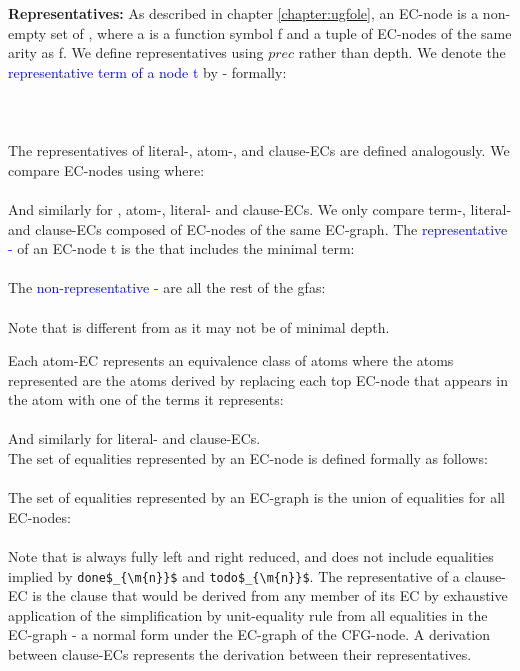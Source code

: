 \textbf{Representatives:}
As described in chapter \ref{chapter:ugfole}, an EC-node is a non-empty set of \GFAs{}, where a \GFA{}  is a function symbol f and a tuple  of EC-nodes of the same arity as f. We define representatives using $prec$ rather than depth.
We denote the \textcolor{blue}{representative term of a node t} by \textcolor{blue}{} - formally:\\
\\
\\
\\
The representatives of literal-, atom-, and clause-ECs are defined analogously.
We compare EC-nodes using \m{\prec} where:\\
\\
And similarly for \GFAs{}, atom-, literal- and clause-ECs.
We only compare term-, literal- and clause-ECs composed of EC-nodes of the same EC-graph.
The \textcolor{blue}{representative \GFA{} - } of an EC-node t is the \GFA{} that includes the minimal term:\\
\\
The \textcolor{blue}{non-representative \GFAs{} -} are all the rest of the gfas:\\
\\
Note that  is different from  as it may not be of minimal depth.

Each atom-EC represents an equivalence class of atoms where the atoms represented are the atoms derived by replacing each top EC-node that appears in the atom with one of the terms it represents:\\
\\
And similarly for literal- and clause-ECs.\\
The set of equalities represented by an EC-node is defined formally as follows:\\
\\
The set of equalities represented by an EC-graph is the union of equalities for all EC-nodes:\\
\\
Note that  is always fully left and right reduced, and does not include equalities implied by \lstinline|done$_{\m{n}}$| and \lstinline|todo$_{\m{n}}$|.
The representative of a clause-EC is the clause that would be derived from any member of its EC by exhaustive application of the simplification by unit-equality rule from all equalities in the EC-graph - a normal form under the EC-graph of the CFG-node.
A derivation between clause-ECs represents the derivation between their representatives.

